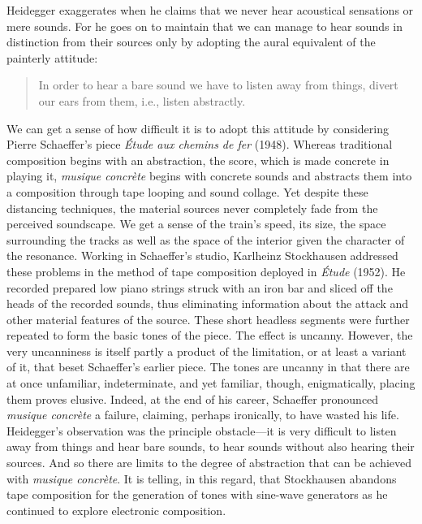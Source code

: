 Heidegger exaggerates when he claims that we never hear acoustical sensations or mere sounds. For he goes on to maintain that we can manage to hear sounds in distinction from their sources only by adopting the aural equivalent of the painterly attitude:
\begin{quote}
    In order to hear a bare sound we have to listen away from things, divert our ears from them, i.e., listen abstractly. \citep[152]{Heidegger:1935uq}
\end{quote}
We can get a sense of how difficult it is to adopt this attitude by considering Pierre Schaeffer's piece \emph{Étude aux chemins de fer} (1948). Whereas traditional composition begins with an abstraction, the score, which is made concrete in playing it, \emph{musique concrète} begins with concrete sounds and abstracts them into a composition through tape looping and sound collage. Yet despite these distancing techniques, the material sources never completely fade from the perceived soundscape. We get a sense of the train's speed, its size, the space surrounding the tracks as well as the space of the interior given the character of the resonance. Working in Schaeffer's studio, Karlheinz Stockhausen addressed these problems in the method of tape composition deployed in \emph{Étude} (1952). He recorded prepared low piano strings struck with an iron bar and sliced off the heads of the recorded sounds, thus eliminating information about the attack and other material features of the source. These short headless segments were further repeated to form the basic tones of the piece. The effect is uncanny. However, the very uncanniness is itself partly a product of the limitation, or at least a variant of it, that beset Schaeffer's earlier piece. The tones are uncanny in that there are at once unfamiliar, indeterminate, and yet familiar, though, enigmatically, placing them proves elusive. Indeed, at the end of his career, Schaeffer pronounced \emph{musique concrète} a failure, claiming, perhaps ironically, to have wasted his life. Heidegger's observation was the principle obstacle---it is very difficult to listen away from things and hear bare sounds, to hear sounds without also hearing their sources. And so there are limits to the degree of abstraction that can be achieved with \emph{musique concrète}. It is telling, in this regard, that Stockhausen abandons tape composition for the generation of tones with sine-wave generators as he continued to explore electronic composition.

